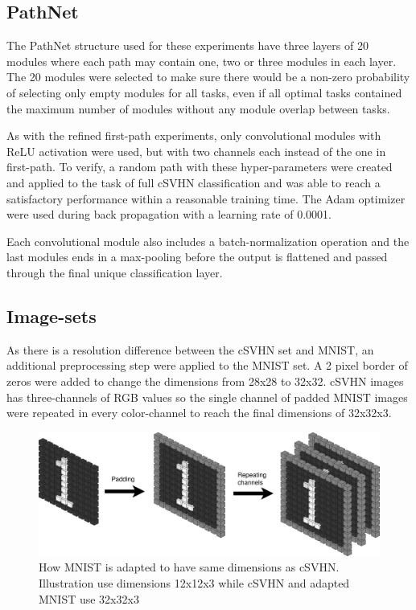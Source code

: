 \subsection{PathNet}
The PathNet structure used for these experiments have three layers of 20 modules where each path may contain one, two or three modules in each layer. The 20 modules were selected to make sure there would be a non-zero probability of selecting only empty modules for all tasks, even if all optimal tasks contained the maximum number of modules without any module overlap between tasks.

As with the refined first-path experiments, only convolutional modules with ReLU activation were used, but with two channels each instead of the one in first-path. To verify, a random path with these hyper-parameters were created and applied to the task of full cSVHN classification and was able to reach a satisfactory performance within a reasonable training time. The Adam optimizer were used during back propagation with a learning rate of 0.0001. 

Each convolutional module also includes a batch-normalization operation and the last modules ends in a max-pooling before the output is flattened and passed through the final unique classification layer. 

\subsection{Image-sets}
As there is a resolution difference between the cSVHN set and MNIST, an additional preprocessing step were applied to the MNIST set. A 2 pixel border of zeros were added to change the dimensions from 28x28 to 32x32. cSVHN images has three-channels of RGB values so the single channel of padded MNIST images were repeated in every color-channel to reach the final dimensions of 32x32x3.  

\begin{figure}[ht]
    \includegraphics[width=\textwidth]{Chapters/4.Experiments/exp2/figures/MNISTpadding+repeating.png}
    \caption{How MNIST is adapted to have same dimensions as cSVHN. Illustration use dimensions 12x12x3 while cSVHN and adapted MNIST use 32x32x3}
    \label{fig:MNISTpadding}
\end{figure}

